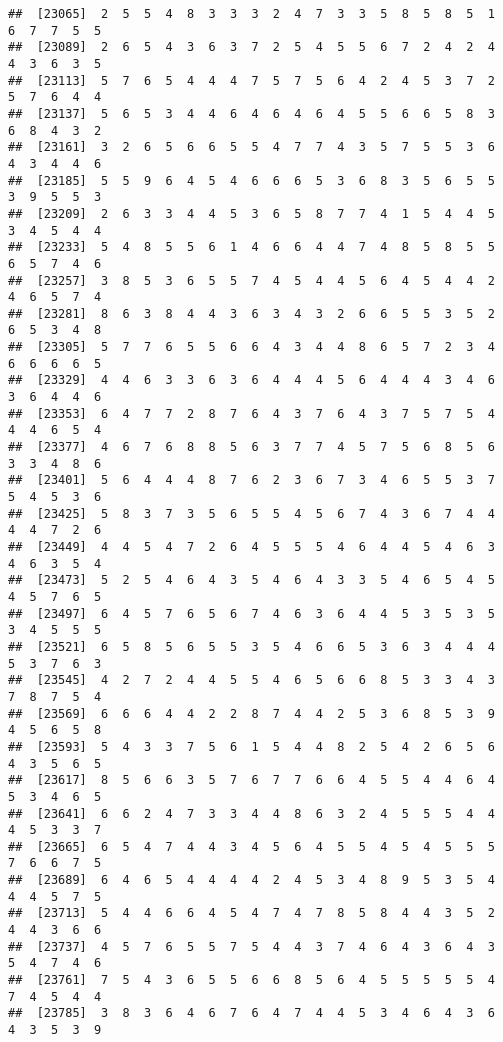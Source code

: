 \documentclass[
]{book}
\begin{document}
\begin{verbatim}
##  [23065]  2  5  5  4  8  3  3  3  2  4  7  3  3  5  8  5  8  5  1  6  7  7  5  5
##  [23089]  2  6  5  4  3  6  3  7  2  5  4  5  5  6  7  2  4  2  4  4  3  6  3  5
##  [23113]  5  7  6  5  4  4  4  7  5  7  5  6  4  2  4  5  3  7  2  5  7  6  4  4
##  [23137]  5  6  5  3  4  4  6  4  6  4  6  4  5  5  6  6  5  8  3  6  8  4  3  2
##  [23161]  3  2  6  5  6  6  5  5  4  7  7  4  3  5  7  5  5  3  6  4  3  4  4  6
##  [23185]  5  5  9  6  4  5  4  6  6  6  5  3  6  8  3  5  6  5  5  3  9  5  5  3
##  [23209]  2  6  3  3  4  4  5  3  6  5  8  7  7  4  1  5  4  4  5  3  4  5  4  4
##  [23233]  5  4  8  5  5  6  1  4  6  6  4  4  7  4  8  5  8  5  5  6  5  7  4  6
##  [23257]  3  8  5  3  6  5  5  7  4  5  4  4  5  6  4  5  4  4  2  4  6  5  7  4
##  [23281]  8  6  3  8  4  4  3  6  3  4  3  2  6  6  5  5  3  5  2  6  5  3  4  8
##  [23305]  5  7  7  6  5  5  6  6  4  3  4  4  8  6  5  7  2  3  4  6  6  6  6  5
##  [23329]  4  4  6  3  3  6  3  6  4  4  4  5  6  4  4  4  3  4  6  3  6  4  4  6
##  [23353]  6  4  7  7  2  8  7  6  4  3  7  6  4  3  7  5  7  5  4  4  4  6  5  4
##  [23377]  4  6  7  6  8  8  5  6  3  7  7  4  5  7  5  6  8  5  6  3  3  4  8  6
##  [23401]  5  6  4  4  4  8  7  6  2  3  6  7  3  4  6  5  5  3  7  5  4  5  3  6
##  [23425]  5  8  3  7  3  5  6  5  5  4  5  6  7  4  3  6  7  4  4  4  4  7  2  6
##  [23449]  4  4  5  4  7  2  6  4  5  5  5  4  6  4  4  5  4  6  3  4  6  3  5  4
##  [23473]  5  2  5  4  6  4  3  5  4  6  4  3  3  5  4  6  5  4  5  4  5  7  6  5
##  [23497]  6  4  5  7  6  5  6  7  4  6  3  6  4  4  5  3  5  3  5  3  4  5  5  5
##  [23521]  6  5  8  5  6  5  5  3  5  4  6  6  5  3  6  3  4  4  4  5  3  7  6  3
##  [23545]  4  2  7  2  4  4  5  5  4  6  5  6  6  8  5  3  3  4  3  7  8  7  5  4
##  [23569]  6  6  6  4  4  2  2  8  7  4  4  2  5  3  6  8  5  3  9  4  5  6  5  8
##  [23593]  5  4  3  3  7  5  6  1  5  4  4  8  2  5  4  2  6  5  6  4  3  5  6  5
##  [23617]  8  5  6  6  3  5  7  6  7  7  6  6  4  5  5  4  4  6  4  5  3  4  6  5
##  [23641]  6  6  2  4  7  3  3  4  4  8  6  3  2  4  5  5  5  4  4  4  5  3  3  7
##  [23665]  6  5  4  7  4  4  3  4  5  6  4  5  5  4  5  4  5  5  5  7  6  6  7  5
##  [23689]  6  4  6  5  4  4  4  4  2  4  5  3  4  8  9  5  3  5  4  4  4  5  7  5
##  [23713]  5  4  4  6  6  4  5  4  7  4  7  8  5  8  4  4  3  5  2  4  4  3  6  6
##  [23737]  4  5  7  6  5  5  7  5  4  4  3  7  4  6  4  3  6  4  3  5  4  7  4  6
##  [23761]  7  5  4  3  6  5  5  6  6  8  5  6  4  5  5  5  5  5  4  7  4  5  4  4
##  [23785]  3  8  3  6  4  6  7  6  4  7  4  4  5  3  4  6  4  3  6  4  3  5  3  9

\end{verbatim}
\end{document}
